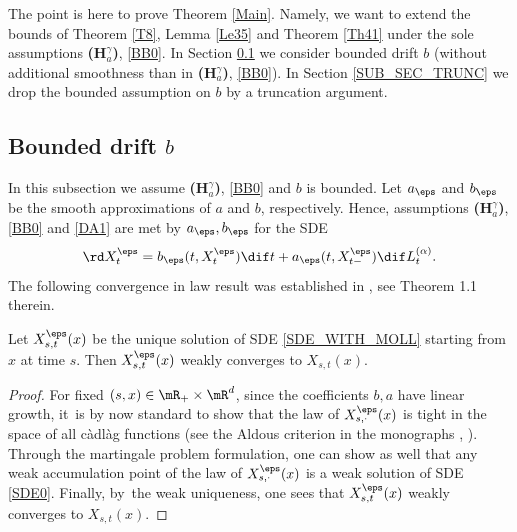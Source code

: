 The point is here to prove Theorem \ref{Main}. Namely, we want to extend the bounds of Theorem \ref{T8}, Lemma \ref{Le35} and Theorem \ref{Th41} under the sole assumptions {\bf (H$^\gamma_a$)}, \eqref{BB0}.
In Section \ref{SUB_SEC_BD} we consider bounded drift $b$ (without additional smoothness than in {\bf (H$^\gamma_a$)}, \eqref{BB0}).
In Section \ref{SUB_SEC_TRUNC} we drop the bounded assumption on $b$ by a truncation argument.
\subsection{Bounded drift $b$}\label{SUB_SEC_BD}
In this subsection we assume {\bf (H$^\gamma_a$)}, \eqref{BB0} and $b$ is bounded.
Let $a_\eps$ and $b_\eps$ be the smooth approximations of $a$ and $b$, respectively. Hence, assumptions {\bf (H$^\gamma_a$)}, \eqref{BB0} and \eqref{DA1} are met by $a_\eps, b_\eps $ for the SDE
\begin{equation}\rd X_t^\eps=b_\eps(t,X_t^\eps)\dif t+a_\eps(t,X_{t-}^\eps)\dif L^{(\alpha)}_t.
\label{SDE_WITH_MOLL}
\end{equation}
The following convergence in law result was established in \cite{CHZ}, see Theorem 1.1 therein.
\begin{theorem}\label{Th62}
Let $X^\eps_{s,t}(x)$ be the unique solution of SDE \eqref{SDE_WITH_MOLL} starting from $x$ at time $s$. Then $X^\eps_{s,t}(x)$ weakly converges to $X_{s,t}(x)$.
\end{theorem}
\begin{proof}
For fixed $(s,x)\in\mR_+\times\mR^d$, since the coefficients $b,a$ {have} linear growth, it~is by now standard to show that the law of
$X^\eps_{s,\cdot}(x)$ is tight in the space of all càdlàg functions ({see \eg the Aldous criterion in the monographs \cite[Ch.\,VI, Th.\,4.5]{jaco:shir:87}, \cite{bass:11}}). {Through the martingale problem formulation}, one can show {as well} that any weak accumulation point of the law of
$X^\eps_{s,\cdot}(x)$ is a weak solution of SDE \eqref{SDE0}. Finally, by~the weak uniqueness, one sees that
$X^\eps_{s,t}(x)$ weakly converges to $X_{s,t}(x)$.
\end{proof}

